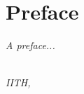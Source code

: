 \chapter*{Preface}

\emph{A preface...}

\begin{flushright}
{\makeatletter\itshape
    \@author \\
    IITH, \monthname{} \the\year{}
\makeatother}
\end{flushright}
